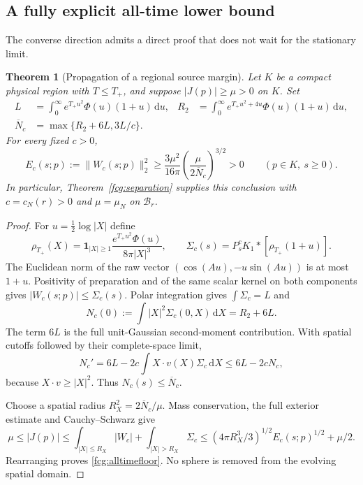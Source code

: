 \documentclass[11pt]{article}
\numberwithin{equation}{section}
\newtheorem{theorem}{Theorem}[section]
\newcommand{\dd}{\,\mathrm d}
\begin{document}
\subsection{A fully explicit all-time lower bound}

The converse direction admits a direct proof that does not wait for
the stationary limit.

\begin{theorem}[Propagation of a regional source margin]
\label{fcg:carrierfloor}
Let $K$ be a compact physical region with $T\le T_+$, and suppose
$|J(p)|\ge\mu>0$ on $K$. Set
\begin{align}
 L&=\int_0^\infty e^{T_+u^2}\Phi(u)(1+u)\dd u,&
 R_2&=\int_0^\infty e^{T_+u^2+4u}\Phi(u)(1+u)\dd u,\nonumber\\
 \overline N_c&=\max\{R_2+6L,3L/c\}.&&\label{fcg:carrierbudgets}
\end{align}
For every fixed $c>0$,
\begin{equation}\label{fcg:alltimefloor}
 E_c(s;p):=\|W_c(s;p)\|_2^2
 \ge\frac{3\mu^2}{16\pi}
       \left(\frac{\mu}{2\overline N_c}\right)^{3/2}>0
 \qquad(p\in K,\ s\ge0).
\end{equation}
In particular, Theorem~\ref{fcg:separation} supplies this conclusion
with $c=c_N(r)>0$ and $\mu=\mu_N$ on $\mathcal B_r$.
\end{theorem}
\begin{proof}
For $u=\tfrac12\log|X|$ define
\[
 \rho_{T_+}(X)=\mathbf1_{|X|\ge1}
       \frac{e^{T_+u^2}\Phi(u)}{8\pi|X|^3},\qquad
 \Sigma_c(s)=P_s^c K_1*[\rho_{T_+}(1+u)].
\]
The Euclidean norm of the raw vector
$(\cos(Au),-u\sin(Au))$ is at most $1+u$.
Positivity of preparation and of the same scalar kernel on both
components gives $|W_c(s;p)|\le\Sigma_c(s)$.
Polar integration gives $\int\Sigma_c=L$ and
\[
 N_c(0):=\int|X|^2\Sigma_c(0,X)\dd X=R_2+6L.
\]
The term $6L$ is the full unit-Gaussian second-moment contribution.
With spatial cutoffs followed by their complete-space limit,
\[
 N_c'=6L-2c\int X\cdot v(X)\Sigma_c\dd X
       \le6L-2cN_c,
\]
because $X\cdot v\ge|X|^2$. Thus $N_c(s)\le\overline N_c$.

Choose a spatial radius $R_X^2=2\overline N_c/\mu$.
Mass conservation, the full exterior estimate and Cauchy--Schwarz give
\[
 \mu\le|J(p)|
 \le\int_{|X|\le R_X}|W_c|+\int_{|X|>R_X}\Sigma_c
 \le(4\pi R_X^3/3)^{1/2}E_c(s;p)^{1/2}+\mu/2.
\]
Rearranging proves \eqref{fcg:alltimefloor}. No sphere is removed
from the evolving spatial domain.
\end{proof}
\end{document}
